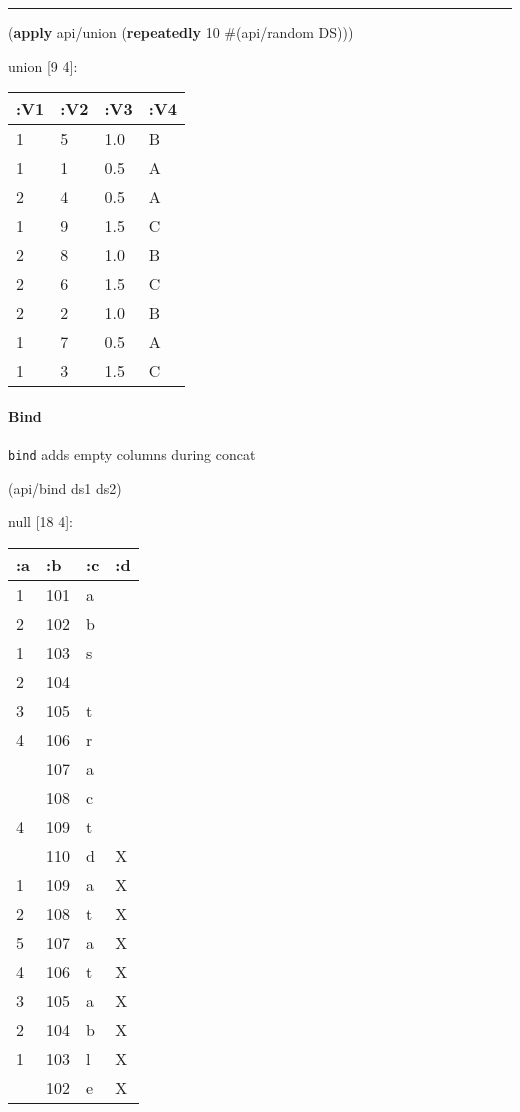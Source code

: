 \documentclass[]{article}
\newenvironment{Shaded}{\begin{snugshade}}{\end{snugshade}}
\newcommand{\DecValTok}[1]{\textcolor[rgb]{0.00,0.00,0.81}{#1}}
\newcommand{\KeywordTok}[1]{\textcolor[rgb]{0.13,0.29,0.53}{\textbf{#1}}}
\newcommand{\NormalTok}[1]{#1}
\let\oldparagraph\paragraph
\renewcommand{\paragraph}[1]{\oldparagraph{#1}\mbox{}}
\begin{document}
\begin{center}\rule{0.5\linewidth}{0.5pt}\end{center}

\begin{Shaded}
\begin{Highlighting}[]
\NormalTok{(}\KeywordTok{apply}\NormalTok{ api/union (}\KeywordTok{repeatedly} \DecValTok{10}\NormalTok{ #(api/random DS)))}
\end{Highlighting}
\end{Shaded}

union {[}9 4{]}:

\begin{longtable}[]{@{}llll@{}}
\toprule
:V1 & :V2 & :V3 & :V4\tabularnewline
\midrule
\endhead
1 & 5 & 1.0 & B\tabularnewline
1 & 1 & 0.5 & A\tabularnewline
2 & 4 & 0.5 & A\tabularnewline
1 & 9 & 1.5 & C\tabularnewline
2 & 8 & 1.0 & B\tabularnewline
2 & 6 & 1.5 & C\tabularnewline
2 & 2 & 1.0 & B\tabularnewline
1 & 7 & 0.5 & A\tabularnewline
1 & 3 & 1.5 & C\tabularnewline
\bottomrule
\end{longtable}

\hypertarget{bind}{%
\paragraph{Bind}\label{bind}}

\texttt{bind} adds empty columns during concat

\begin{Shaded}
\begin{Highlighting}[]
\NormalTok{(api/bind ds1 ds2)}
\end{Highlighting}
\end{Shaded}

null {[}18 4{]}:

\begin{longtable}[]{@{}llll@{}}
\toprule
:a & :b & :c & :d\tabularnewline
\midrule
\endhead
1 & 101 & a &\tabularnewline
2 & 102 & b &\tabularnewline
1 & 103 & s &\tabularnewline
2 & 104 & &\tabularnewline
3 & 105 & t &\tabularnewline
4 & 106 & r &\tabularnewline
& 107 & a &\tabularnewline
& 108 & c &\tabularnewline
4 & 109 & t &\tabularnewline
& 110 & d & X\tabularnewline
1 & 109 & a & X\tabularnewline
2 & 108 & t & X\tabularnewline
5 & 107 & a & X\tabularnewline
4 & 106 & t & X\tabularnewline
3 & 105 & a & X\tabularnewline
2 & 104 & b & X\tabularnewline
1 & 103 & l & X\tabularnewline
& 102 & e & X\tabularnewline
\bottomrule
\end{longtable}
\end{document}
